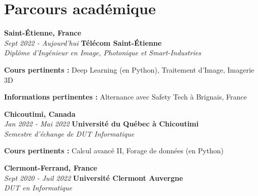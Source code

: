     
    \section{Parcours académique}
        \begin{twocolentry}{
            \textbf{Saint-Étienne, France}\\
            \textit{Sept 2022 - Aujourd'hui}
            }{
            \textbf{Télécom Saint-Étienne}\\
            \textit{Diplôme d'Ingénieur en Image, Photonique et Smart-Industries}
            }
        \end{twocolentry}


        \begin{onecolentry}
            \begin{highlights}
                \item \textbf{Cours pertinents :} Deep Learning (en Python), Traitement d'Image, Imagerie 3D
                \item \textbf{Informations pertinentes :} Alternance avec Safety Tech à Brignais, France
            \end{highlights}
        \end{onecolentry}

		\begin{twocolentry}{
			\textbf{Chicoutimi, Canada} \\
			\textit{Jan 2022 - Mai 2022}
            }{
            \textbf{Université du Québec à Chicoutimi} \\
            \textit{Semestre d'échange de DUT Informatique}
            }
        \end{twocolentry}

        \begin{onecolentry}
            \begin{highlights}
                \item \textbf{Cours pertinents :} Calcul avancé II, Forage de données (en Python)
            \end{highlights}
        \end{onecolentry}

		\begin{twocolentry}{
			\textbf{Clermont-Ferrand, France} \\
			\textit{Sept 2020 - Juil 2022}
            }{
            \textbf{Université Clermont Auvergne} \\
            \textit{DUT en Informatique}
            }
        \end{twocolentry}

